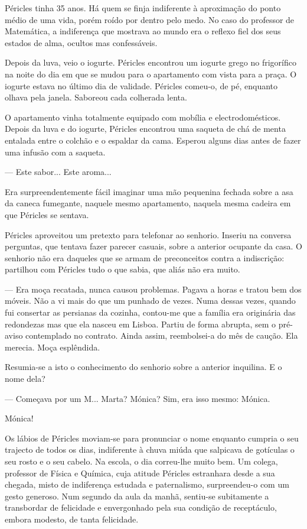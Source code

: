 Péricles tinha 35 anos. Há quem se finja indiferente à aproximação do
ponto médio de uma vida, porém roído por dentro pelo medo. No caso do
professor de Matemática, a indiferença que mostrava ao mundo era o
reflexo fiel dos seus estados de alma, ocultos mas confessáveis.

Depois da luva, veio o iogurte. Péricles encontrou um iogurte grego no
frigorífico na noite do dia em que se mudou para o apartamento com vista
para a praça. O iogurte estava no último dia de validade. Péricles
comeu-o, de pé, enquanto olhava pela janela. Saboreou cada colherada
lenta.

O apartamento vinha totalmente equipado com mobília e electrodomésticos.
Depois da luva e do iogurte, Péricles encontrou uma saqueta de chá de
menta entalada entre o colchão e o espaldar da cama. Esperou alguns dias
antes de fazer uma infusão com a saqueta.

--- Este sabor... Este aroma...

Era surpreendentemente fácil imaginar uma mão pequenina fechada sobre
a asa da caneca fumegante, naquele mesmo apartamento, naquela mesma
cadeira em que Péricles se sentava.

Péricles aproveitou um pretexto para telefonar ao senhorio. Inseriu na
conversa perguntas, que tentava fazer parecer casuais, sobre a anterior
ocupante da casa. O senhorio não era daqueles que se armam de
preconceitos contra a indiscrição: partilhou com Péricles tudo o que
sabia, que aliás não era muito.

--- Era moça recatada, nunca causou problemas. Pagava a horas e tratou bem
  dos móveis. Não a vi mais do que um punhado de vezes. Numa dessas
  vezes, quando fui consertar as persianas da cozinha, contou-me que a
  família era originária das redondezas mas que ela nasceu em Lisboa.
  Partiu de forma abrupta, sem o pré-aviso contemplado no contrato.
  Ainda assim, reembolsei-a do mês de caução. Ela merecia. Moça esplêndida.

Resumia-se a isto o conhecimento do senhorio sobre a anterior
inquilina. E o nome dela?

--- Começava por um M... Marta? Mónica? Sim, era isso mesmo: Mónica.


Mónica!

Os lábios de Péricles moviam-se para pronunciar o nome enquanto cumpria
o seu trajecto de todos os dias, indiferente à chuva miúda que salpicava
de gotículas o seu rosto e o seu cabelo. Na escola, o dia correu-lhe
muito bem. Um colega, professor de Física e Química, cuja atitude
Péricles estranhara desde a sua chegada, misto de indiferença estudada e
paternalismo, surpreendeu-o com um gesto generoso. Num segundo da aula
da manhã, sentiu-se subitamente a transbordar de felicidade e envergonhado pela sua condição de receptáculo, embora
modesto, de tanta felicidade.

